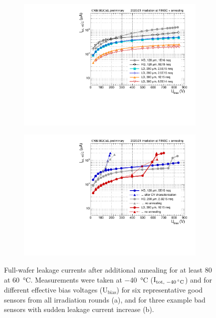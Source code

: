 \begin{figure}
	\captionsetup[subfigure]{aboveskip=-1pt,belowskip=-1pt}
	\centering
	\begin{subfigure}[b]{0.49\textwidth}
		\includegraphics[width=0.999\textwidth]{plots/total_iv/total_current_IV.pdf}
		\subcaption{
		}
		\label{plot:tot_IV_good}
	\end{subfigure}
	\hfill
	\begin{subfigure}[b]{0.49\textwidth}
		\includegraphics[width=0.999\textwidth]{plots/total_iv/total_current_IV_bad.pdf}
		\subcaption{
		}
		\label{plot:tot_IV_bad}
	\end{subfigure}
	\caption{
		Full-wafer leakage currents after additional annealing for at least \SI{80}{\min} at \SI{60}{\celsius}. Measurements were taken at \SI{-40}{\celsius} ($\text{I}_\text{tot, \SI{-40}{\celsius}}$) and for different effective bias voltages ($\text{U}_\text{bias}$) 
		for six representative good sensors from all irradiation rounds (a), and for three example bad sensors with sudden leakage current increase (b).
	}
\end{figure}




